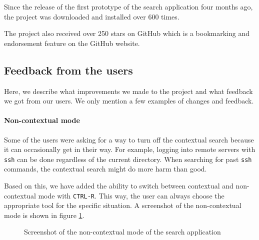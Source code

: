 Since the release of the first prototype of the search application four months ago, the project was downloaded and installed over 600 times. 

The project also received over 250 stars on GitHub which is a bookmarking and endorsement feature on the GitHub website.\cite{github-stars}\cite{resh-github-homepage}


\subsection{Feedback from the users}

Here, we describe what improvements we made to the project and what feedback we got from our users. We only mention a few examples of changes and feedback.

\paragraph{Non-contextual mode}

Some of the users were asking for a way to turn off the contextual search because it can occasionally get in their way. For example, logging into remote servers with \verb|ssh| can be done regardless of the current directory. When searching for past \verb|ssh| commands, the contextual search might do more harm than good.

Based on this, we have added the ability to switch between contextual and non-contextual mode with \verb|CTRL-R|. This way, the user can always choose the appropriate tool for the specific situation. A screenshot of the non-contextual mode is shown in figure \ref{xterm-resh-raw-80}.

\begin{figure}
\caption{Screenshot of the non-contextual mode of the search application}
\label{xterm-resh-raw-80}
\end{figure}

